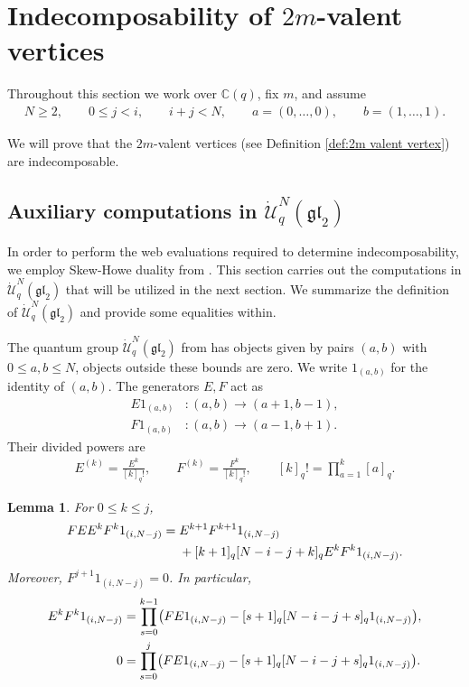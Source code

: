 \documentclass[12pt]{amsart}
\newtheorem{lemma}[theorem]{Lemma}
\theoremstyle{definition}
\theoremstyle{remark}
\numberwithin{equation}{section}
\numberwithin{figure}{section}
\newcommand{\GL}{\mathfrak{gl}}
\newcommand{\C}{\mathbb{C}}
\begin{document}
\section{Indecomposability of $2m$-valent vertices}\label{sec:indecomposabilis 2m vertex}
Throughout this section we work over $\C(q)$, fix $m$, and assume
\begin{align*}
    N\geq 2,\qquad 0\leq j<i,\qquad i+j<N,\qquad a =(0,\ldots,0), \qquad b = (1, \ldots, 1). 
\end{align*}

We will prove that the $2m$-valent vertices (see Definition \ref{def:2m valent vertex}) are indecomposable.

\subsection{Auxiliary computations in $\dot{\mathcal U}_q^{N}(\GL_2)$}

In order to perform the web evaluations required to determine indecomposability, we employ Skew-Howe duality from \cite{CKM2014}. This section carries out the computations in $\dot{\mathcal U}_q^{N}(\GL_2)$ that will be utilized in the next section. We summarize the definition of $\dot{\mathcal U}_q^{N}(\GL_2)$ and provide some equalities within.

The quantum group $\dot{\mathcal U}_q^{N}(\GL_2)$ from \cite[Section 4.1]{CKM2014} has objects given by pairs $(a,b)$ with $0\leq a,b\leq N$, objects outside these bounds are zero. We write $1_{(a,b)}$ for the identity of $(a,b)$. The generators $E,F$ act as
\begin{align*}
    E1_{(a,b)} &: (a,b)\longrightarrow(a+1,b-1),\\
    F1_{(a,b)} &: (a,b)\longrightarrow(a-1,b+1).
\end{align*}
Their divided powers are
\begin{align*}
    E^{(k)}=\frac{E^k}{[k]_q!},\qquad
    F^{(k)}=\frac{F^k}{[k]_q!},\qquad
    [k]_q!=\prod_{a=1}^k[a]_q.
\end{align*}

\begin{lemma}\label{lem:two-m triangular}
For $0\leq k\leq j$,
\begin{align}\label{eq:two-m triangular}
    FE E^kF^k1_{(i,N-j)}
    ={}&E^{k+1}F^{k+1}1_{(i,N-j)}\notag\\
    &+[k+1]_q[N-i-j+k]_q E^kF^k1_{(i,N-j)}.
\end{align}
Moreover, $F^{j+1}1_{(i,N-j)}=0$. In particular,
\begin{align}\label{eq:two-m Newton}
    E^kF^k1_{(i,N-j)}
    &=\prod_{s=0}^{k-1}\bigl(FE1_{(i,N-j)}-[s+1]_q[N-i-j+s]_q 1_{(i,N-j)}\bigr),\notag\\
    0&=\prod_{s=0}^j\bigl(FE1_{(i,N-j)}-[s+1]_q[N-i-j+s]_q1_{(i,N-j)}\bigr).
\end{align}
\end{lemma}
\end{document}
